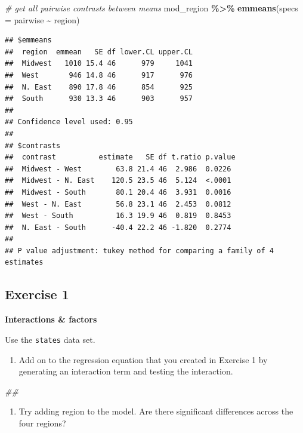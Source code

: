 \documentclass[
]{book}
\newenvironment{Shaded}{\begin{snugshade}}{\end{snugshade}}
\newcommand{\CommentTok}[1]{\textcolor[rgb]{0.56,0.35,0.01}{\textit{#1}}}
\newcommand{\DataTypeTok}[1]{\textcolor[rgb]{0.13,0.29,0.53}{#1}}
\newcommand{\KeywordTok}[1]{\textcolor[rgb]{0.13,0.29,0.53}{\textbf{#1}}}
\newcommand{\NormalTok}[1]{#1}
\newcommand{\OperatorTok}[1]{\textcolor[rgb]{0.81,0.36,0.00}{\textbf{#1}}}
\newcommand{\StringTok}[1]{\textcolor[rgb]{0.31,0.60,0.02}{#1}}
\providecommand{\tightlist}{%
  \setlength{\itemsep}{0pt}\setlength{\parskip}{0pt}}
\begin{document}
\begin{Shaded}
\begin{Highlighting}[]
  \CommentTok{\# get all pairwise contrasts between means}
\NormalTok{  mod\_region }\OperatorTok{\%\textgreater{}\%}
\StringTok{      }\KeywordTok{emmeans}\NormalTok{(}\DataTypeTok{specs =}\NormalTok{ pairwise }\OperatorTok{\textasciitilde{}}\StringTok{ }\NormalTok{region)}
\end{Highlighting}
\end{Shaded}

\begin{verbatim}
## $emmeans
##  region  emmean   SE df lower.CL upper.CL
##  Midwest   1010 15.4 46      979     1041
##  West       946 14.8 46      917      976
##  N. East    890 17.8 46      854      925
##  South      930 13.3 46      903      957
## 
## Confidence level used: 0.95 
## 
## $contrasts
##  contrast          estimate   SE df t.ratio p.value
##  Midwest - West        63.8 21.4 46  2.986  0.0226 
##  Midwest - N. East    120.5 23.5 46  5.124  <.0001 
##  Midwest - South       80.1 20.4 46  3.931  0.0016 
##  West - N. East        56.8 23.1 46  2.453  0.0812 
##  West - South          16.3 19.9 46  0.819  0.8453 
##  N. East - South      -40.4 22.2 46 -1.820  0.2774 
## 
## P value adjustment: tukey method for comparing a family of 4 estimates
\end{verbatim}

\hypertarget{exercise-1-1}{%
\subsection{Exercise 1}\label{exercise-1-1}}

\textbf{Interactions \& factors}

Use the \texttt{states} data set.

\begin{enumerate}
\def\labelenumi{\arabic{enumi}.}
\tightlist
\item
  Add on to the regression equation that you created in Exercise 1 by generating an interaction term and testing the interaction.
\end{enumerate}

\begin{Shaded}
\begin{Highlighting}[]
\CommentTok{\#\# }
\end{Highlighting}
\end{Shaded}

\begin{enumerate}
\def\labelenumi{\arabic{enumi}.}
\setcounter{enumi}{1}
\tightlist
\item
  Try adding region to the model. Are there significant differences across the four regions?
\end{enumerate}
\end{document}
